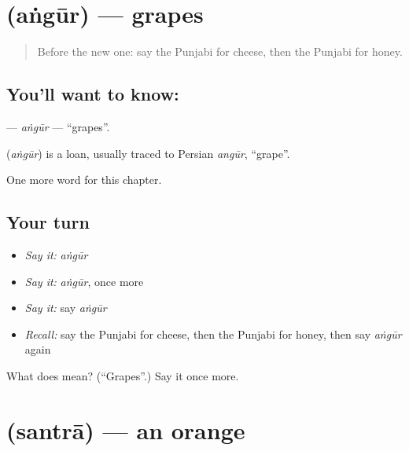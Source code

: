 \section[\texorpdfstring{\pa{ਅੰਗੂਰ} (aṅgūr)}{ਅੰਗੂਰ (aṅgūr)}]{ (aṅgūr) — grapes}

\label{lesson:PA-C66-angur}



\begin{quote}
Before the new one: say the Punjabi for cheese, then the Punjabi for honey.
\end{quote}

\subsection*{You'll want to know: }
\textbf{} — \emph{aṅgūr} — \textquotedblleft{}grapes\textquotedblright{}.

\begin{cousinweb}
\textbf{} (\emph{aṅgūr}) is a loan, usually traced to Persian \emph{angūr}, \textquotedblleft{}grape\textquotedblright{}.
\end{cousinweb}

\begin{grammarlens}[title={What you've built}]
One more word for this chapter.
\end{grammarlens}

\subsection*{Your turn}
\begin{itemize}
\raggedright
  \item \emph{Say it:} \emph{aṅgūr}
  \item \emph{Say it:} \emph{aṅgūr}, once more
  \item \emph{Say it:} say \emph{aṅgūr}
  \item \emph{Recall:} say the Punjabi for cheese, then the Punjabi for honey, then say \emph{aṅgūr} again
\end{itemize}

\begin{tcolorbox}[breakable,colback=teal!4,colframe=teal!35!black,title={Before you move on}]
What does  mean? (\textquotedblleft{}Grapes\textquotedblright{}.) Say it once more.
\end{tcolorbox}
\section[\texorpdfstring{\pa{ਸੰਤਰਾ} (santrā)}{ਸੰਤਰਾ (santrā)}]{ (santrā) — an orange}

